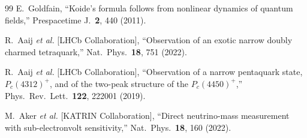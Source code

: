 \documentclass[11pt,a4paper]{article}
\begin{document}
\begin{thebibliography}{99}
  E.~Goldfain,
  ``Koide's formula follows from nonlinear dynamics of quantum
  fields,''
  Prespacetime J.\ \textbf{2}, 440 (2011).

  R.~Aaij \textit{et al.} [LHCb Collaboration],
  ``Observation of an exotic narrow doubly charmed tetraquark,''
  Nat.\ Phys.\ \textbf{18}, 751 (2022).

  R.~Aaij \textit{et al.} [LHCb Collaboration],
  ``Observation of a narrow pentaquark state, $P_c(4312)^+$,
  and of the two-peak structure of the $P_c(4450)^+$,''
  Phys.\ Rev.\ Lett.\ \textbf{122}, 222001 (2019).

  M.~Aker \textit{et al.} [KATRIN Collaboration],
  ``Direct neutrino-mass measurement with sub-electronvolt
  sensitivity,''
  Nat.\ Phys.\ \textbf{18}, 160 (2022).

\end{thebibliography}
\end{document}
